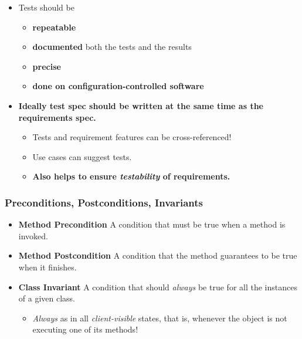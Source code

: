 \documentclass[a4paper]{article}
\providecommand{\tightlist}{%
  \setlength{\itemsep}{0pt}\setlength{\parskip}{0pt}}
\begin{document}
\begin{itemize}
\tightlist
\item
  Tests should be

  \begin{itemize}
  \tightlist
  \item
    \textbf{repeatable}
  \item
    \textbf{documented} both the tests and the results
  \item
    \textbf{precise}
  \item
    \textbf{done on configuration-controlled software}
  \end{itemize}
\item
  \textbf{Ideally test spec should be written at the same time as the
  requirements spec.}

  \begin{itemize}
  \tightlist
  \item
    Tests and requirement features can be cross-referenced!
  \item
    Use cases can suggest tests.
  \item
    \textbf{Also helps to ensure \emph{testability} of requirements.}
  \end{itemize}
\end{itemize}

\hypertarget{preconditions-postconditions-invariants}{%
\subsubsection{Preconditions, Postconditions,
Invariants}\label{preconditions-postconditions-invariants}}

\begin{itemize}
\tightlist
\item
  \textbf{Method Precondition} A condition that must be true when a
  method is invoked.
\item
  \textbf{Method Postcondition} A condition that the method guarantees
  to be true when it finishes.
\item
  \textbf{Class Invariant} A condition that should \emph{always} be true
  for all the instances of a given class.

  \begin{itemize}
  \tightlist
  \item
    \emph{Always} as in all \emph{client-visible} states, that is,
    whenever the object is not executing one of its methods!
  \end{itemize}
\end{itemize}
\end{document}
